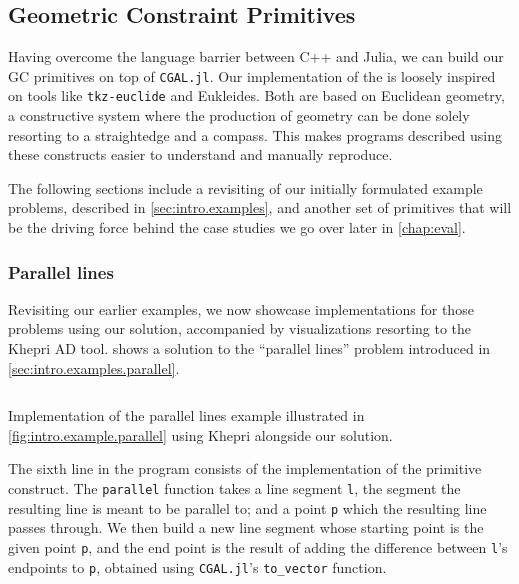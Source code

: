 \subsection{Geometric Constraint Primitives}%
\label{sec:solution.impl.gcps}

Having overcome the language barrier between C++ and Julia, we can build our
\ac{GC} primitives on top of \texttt{CGAL.jl}.  Our implementation of the
\primitives{} is loosely inspired on tools like \texttt{tkz-euclide} and
Eukleides.  Both are based on Euclidean geometry, a constructive system where
the production of geometry can be done solely resorting to a straightedge and a
compass.  This makes programs described using these constructs easier to
understand and manually reproduce.

The following sections include a revisiting of our initially formulated example 
problems, described in \cref{sec:intro.examples}, and another set of primitives
that will be the driving force behind the case studies we go over later in
\cref{chap:eval}.

\subsubsection{Parallel lines}%
\label{sec:solution.impl.gcps.parallel}

Revisiting our earlier examples, we now showcase implementations for those
problems using our solution, accompanied by visualizations resorting to the
Khepri \ac{AD} tool.   shows a solution to
the ``parallel lines'' problem introduced in \cref{sec:intro.examples.parallel}.

\begin{listing}[htbp]
  \inputminted{julia}{jl/ex_parallel.jl}
  \caption[Parallel lines example using our solution]{
    Implementation of the parallel lines example illustrated in
    \cref{fig:intro.example.parallel} using Khepri alongside our solution.}%
  \label{lst:solution.impl.gcps.parallel}
\end{listing}

The sixth line in the program consists of the implementation of the primitive
construct.  The \texttt{parallel} function takes a line segment \texttt{l}, the
segment the resulting line is meant to be parallel to; and a point \texttt{p}
which the resulting line passes through.  We then build a new line segment whose
starting point is the given point \texttt{p}, and the end point is the result of
adding the difference between \texttt{l}'s endpoints to \texttt{p}, obtained
using \texttt{CGAL.jl}'s \texttt{to\_vector} function.

